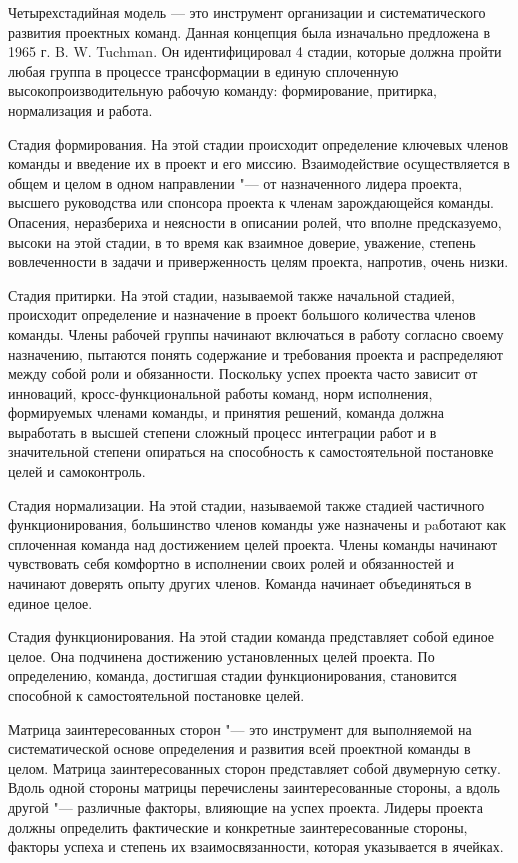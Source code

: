 \documentclass{../industrial-development}
\begin{document}
Четырехстадийная модель — это инструмент организации и систематического развития проектных команд. Данная концепция была изначально предложена в 1965 г. B. W. Tuchman. Он идентифицировал 4 стадии, которые должна пройти любая группа в процессе трансформации в единую сплоченную высокопроизводительную рабочую команду: формирование, притирка, нормализация и работа.

Стадия формирования. На этой стадии происходит определение ключевых членов команды и введение их в проект и его миссию. Взаимодействие осуществляется в общем и целом в одном направлении "--- от назначенного лидера проекта, высшего руководства или спонсора проекта к членам зарождающейся команды. Опасения, неразбериха и неясности в описании ролей, что вполне предсказуемо, высоки на этой стадии, в то время как взаимное
доверие, уважение, степень вовлеченности в задачи и приверженность целям проекта, напротив, очень низки. 

Стадия притирки. На этой стадии, называемой также начальной стадией, происходит определение и назначение в проект большого количества членов команды. Члены рабочей группы начинают включаться в работу согласно своему назначению, пытаются понять содержание и требования проекта и распределяют между собой роли и обязанности. Поскольку успех проекта часто зависит от инноваций, кросс-функциональной работы команд, норм исполнения, формируемых членами команды, и принятия решений, команда должна выработать в высшей степени сложный процесс интеграции работ и в значительной степени опираться на способность к самостоятельной постановке целей и самоконтроль.

Стадия нормализации. На этой стадии, называемой также стадией частичного функционирования, большинство членов команды уже назначены и paботают как сплоченная команда над достижением целей проекта. Члены команды начинают чувствовать себя комфортно в исполнении своих ролей и обязанностей и начинают доверять опыту других членов. Команда начинает объединяться в единое целое.

Стадия функционирования. На этой стадии команда представляет собой единое целое. Она подчинена достижению установленных целей проекта. По определению, команда, достигшая стадии функционирования, становится способной к самостоятельной постановке целей.

Матрица заинтересованных сторон "--- это инструмент для выполняемой на систематической основе определения и развития всей проектной команды в целом. Матрица заинтересованных сторон представляет собой двумерную сетку. Вдоль одной стороны матрицы перечислены заинтересованные стороны, а вдоль другой "--- различные факторы, влияющие на успех проекта. Лидеры проекта должны определить фактические и конкретные заинтересованные стороны, факторы успеха и степень их взаимосвязанности, которая указывается в ячейках.
\end{document}
